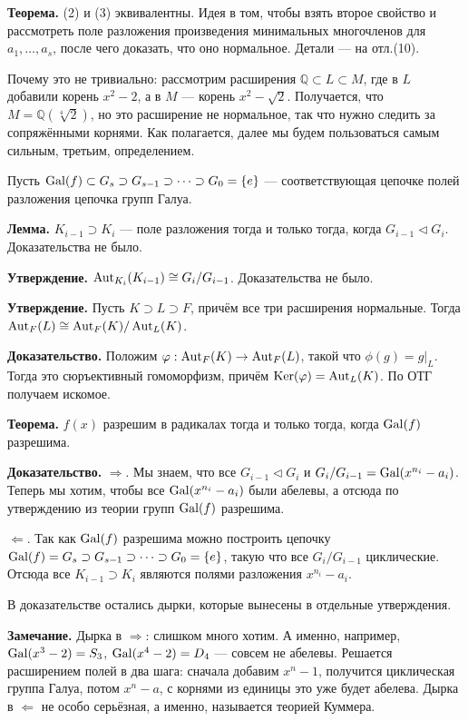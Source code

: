 \textbf{Теорема.} (2) и (3) эквивалентны.
Идея в том, чтобы взять второе свойство и рассмотреть поле разложения произведения минимальных многочленов для $a_1, \dots, a_s$, после чего доказать, что оно нормальное.
Детали --- на отл.(10).

Почему это не тривиально: рассмотрим расширения $\mathbb Q \subset L \subset M$, где в $L$ добавили корень $x^2 - 2$, а в $M$ --- корень $x^2 - \sqrt 2$.
Получается, что $M = \mathbb Q(\sqrt[4]{2})$, но это расширение не нормальное, так что нужно следить за сопряжёнными корнями.
Как полагается, далее мы будем пользоваться самым сильным, третьим, определением.

Пусть $\operatorname{Gal}(f) \subset G_s \supset G_{s-1} \supset \dots \supset G_0 = \{e\}$ --- соответствующая цепочке полей разложения цепочка групп Галуа.

\textbf{Лемма.} $K_{i-1} \supset K_i$ --- поле разложения тогда и только тогда, когда $G_{i-1} \triangleleft G_i$.
Доказательства не было.

\textbf{Утверждение.} $\operatorname{Aut}_{K_i}(K_{i-1}) \cong G_i / G_{i-1}$.
Доказательства не было.

\textbf{Утверждение.} Пусть $K \supset L \supset F$, причём все три расширения нормальные.
Тогда $\operatorname{Aut}_F(L) \cong \operatorname{Aut}_F(K) / \operatorname{Aut}_L(K)$.

\textbf{Доказательство.} Положим $\varphi: \operatorname{Aut}_F(K) \to \operatorname{Aut}_F(L)$, такой что $\phi(g) = g|_L$.
Тогда это сюръективный гомоморфизм, причём $\operatorname{Ker}(\varphi) = \operatorname{Aut}_L(K)$.
По ОТГ получаем искомое.

\QED

\textbf{Теорема.} $f(x)$ разрешим в радикалах тогда и только тогда, когда $\operatorname{Gal}(f)$ разрешима.

\textbf{Доказательство.} $\Rightarrow$. Мы знаем, что все $G_{i-1} \triangleleft G_i$ и $G_i / G_{i-1} = \operatorname{Gal}(x^{n_i} - a_i)$.
Теперь мы хотим, чтобы все $\operatorname{Gal}(x^{n_i} - a_i)$ были абелевы, а отсюда по утверждению из теории групп $\operatorname{Gal}(f)$ разрешима.

$\Leftarrow$. Так как $\operatorname{Gal}(f)$ разрешима можно построить цепочку $\operatorname{Gal}(f) = G_s \supset G_{s-1} \supset \dots \supset G_0 = \{e\}$, такую что все $G_i / G_{i-1}$ циклические.
Отсюда все $K_{i-1} \supset K_i$ являются полями разложения $x^{n_i} - a_i$.

В доказательстве остались дырки, которые вынесены в отдельные утверждения.

\QED

\textbf{Замечание.} Дырка в $\Rightarrow$: слишком много хотим.
А именно, например, $\operatorname{Gal}(x^3 - 2) = S_3$, $\operatorname{Gal}(x^4 - 2) = D_4$ --- совсем не абелевы.
Решается расширением полей в два шага: сначала добавим $x^n - 1$, получится циклическая группа Галуа, потом $x^n - a$, с корнями из единицы это уже будет абелева.
Дырка в $\Leftarrow$ не особо серьёзная, а именно, называется теорией Куммера.

